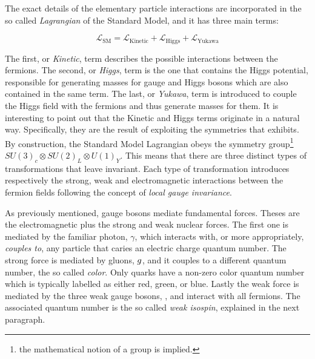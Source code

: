 The exact details of the elementary particle interactions are incorporated in the so called
{\it Lagrangian} of the Standard Model, and it has three main terms:

\begin{equation}
\mathscr{L}_{\text{SM}} =
\mathscr{L}_{\text{Kinetic}} + \mathscr{L}_{\text{Higgs}} + \mathscr{L}_{\text{Yukawa}}
\label{lagrangian}
\end{equation}

\noindent The first, or {\it Kinetic}, term describes the possible interactions between the fermions.
The second, or {\it Higgs}, term is the one that contains the Higgs potential, responsible for generating
masses for gauge and Higgs bosons which are also contained in the same term.
The last, or {\it Yukawa}, term is introduced to couple the Higgs field with the fermions and thus generate masses for them.
It is interesting to point out that the Kinetic and Higgs terms originate in a natural way.
Specifically, they are the result of exploiting the symmetries that  exhibits.
By construction, the Standard Model Lagrangian obeys the symmetry group\footnote{the mathematical notion of a group is implied.}
$SU(3)_c\otimes SU(2)_L\otimes U(1)_Y$. This means that there are three distinct types of transformations
that leave  invariant. Each type of transformation introduces respectively the strong,
weak and electromagnetic interactions between the fermion fields following the concept of {\it local gauge invariance}\cite{aitchison,halzen1984quarks}.

As previously mentioned, gauge bosons mediate fundamental forces. Theses are the electromagnetic plus the strong and weak nuclear forces.
The first one is mediated by the familiar photon, $\gamma$, which interacts with, or more appropriately, {\it couples to}, any particle that
caries an electric charge quantum number. The strong force is mediated by gluons, $g$,
and it couples to a different quantum number, the so called {\it color}.
Only quarks have a non-zero color quantum number which is typically labelled as either red, green, or blue. Lastly the
weak force is mediated by the three weak gauge bosons, \Wpm, \Z and interact with all fermions.
The associated quantum number is the so called {\it weak isospin}, explained in the next paragraph.

